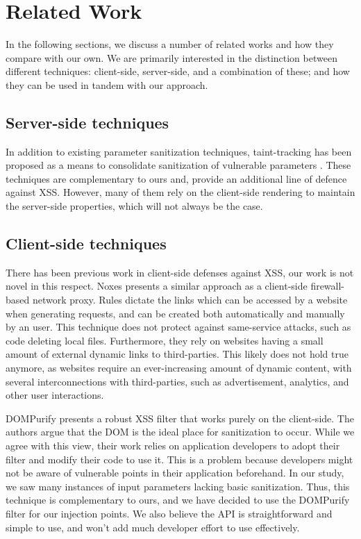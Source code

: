 \section{Related Work}
In the following sections, we discuss a number of related works and how they compare with our own. We are primarily interested in the distinction between different techniques: client-side, server-side, and a combination of these; and how they can be used in tandem with our approach.
\subsection{Server-side techniques} In addition to existing parameter sanitization techniques, taint-tracking has been proposed as a means to consolidate sanitization of vulnerable parameters \cite{Xu:2006:TPE:1267336.1267345,DBLP:conf/sec/Nguyen-TuongGGSE05,Pietraszek:2005:DAI:2146257.2146267,Bisht:2008:XPD:1428322.1428325}. These techniques are complementary to ours and, provide an additional line of defence against XSS. However, many of them rely on the client-side rendering to maintain the server-side properties, which will not always be the case.

\subsection{Client-side techniques} There has been previous work in client-side defenses against XSS, our work is not novel in this respect. Noxes \cite{Kirda:2009:CCS:2639535.2639808} presents a similar approach as a client-side firewall-based network proxy. Rules dictate the links which can be accessed by a website when generating requests, and can be created both automatically and manually by an user. This technique does not protect against same-service attacks, such as code deleting local files. Furthermore, they rely on websites having a small amount of external dynamic links to third-parties. This likely does not hold true anymore, as websites require an ever-increasing amount of dynamic content, with several interconnections with third-parties, such as advertisement, analytics, and other user interactions.

 DOMPurify  \cite{10.1007/978-3-319-66399-9_7} presents a robust XSS filter that works purely on the client-side. The authors argue that the DOM is the ideal place for sanitization to occur. While we agree with this view, their work relies on application developers to adopt their filter and modify their code to use it. This is a problem because developers might not be aware of vulnerable points in their application beforehand. In our study, we saw many instances of input parameters lacking basic sanitization. Thus, this technique is complementary to ours, and we have decided to use the DOMPurify filter for our injection points. We also believe the API is straightforward and simple to use, and won't add much developer effort to use effectively.
 
